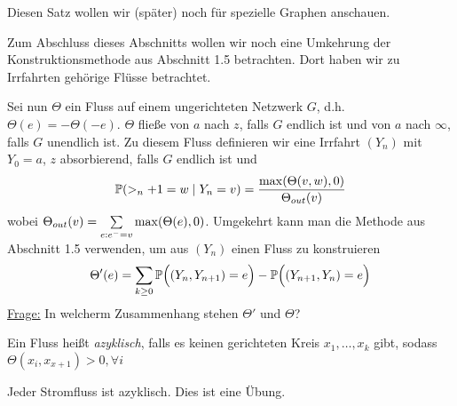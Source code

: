 	Diesen Satz wollen wir (später) noch für spezielle Graphen anschauen. 

Zum Abschluss dieses Abschnitts wollen wir noch eine Umkehrung der Konstruktionsmethode aus Abschnitt 1.5  betrachten. Dort haben wir zu Irrfahrten gehörige Flüsse betrachtet. 

Sei nun $\Theta$ ein Fluss auf einem ungerichteten Netzwerk $G$, d.h. $\Theta(e) = - \Theta(-e)$. $\Theta$ fließe von $a$ nach $z$, falls $G$ endlich ist und von $a$ nach $\infty$, falls $G$ unendlich ist. Zu diesem Fluss definieren wir eine Irrfahrt $(Y_n)$ mit $Y_0 = a$, $z$ absorbierend, falls $G$ endlich ist und 
\begin{align}
	\propE{>_n+1 = w \given Y_n = v} = \frac{\max\enb{\Theta(v,w),0}}{\Theta_{out}(v)}
\end{align}
wobei $\Theta_{out}(v) = \sum\limits_{e: e^-=v} \max\enb{\Theta(e),0}$.
Umgekehrt kann man die Methode aus Abschnitt 1.5 verwenden, um aus $(Y_n)$ einen Fluss zu konstruieren
\begin{align}
	\Theta'(e) = \sum\limits_{k \geq 0}\mathbb{P} \Big( (Y_n,Y_{n+1}) = e\Big) - \mathbb{P}\Big((Y_{n+1},Y_n) = e\Big)
\end{align} 
\underline{Frage:} In welcherm Zusammenhang stehen $\Theta'$ und $\Theta$?
\begin{definition}
	Ein Fluss heißt \emph{azyklisch}, falls es keinen gerichteten Kreis $x_1, \dots, x_k$ gibt, sodass $\Theta(x_i,x_{x+1}) > 0, \forall i$  
\end{definition}

\begin{beispiel}
	Jeder Stromfluss ist azyklisch. Dies ist eine Übung.
\end{beispiel}


